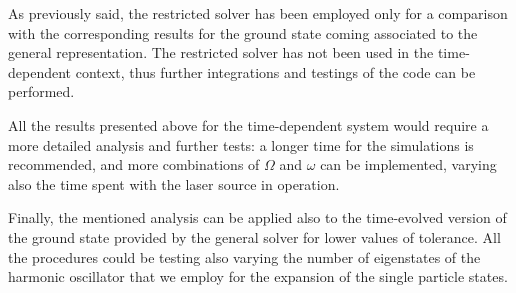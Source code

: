 As previously said, the restricted solver has been employed only for a comparison with the corresponding results for the ground state coming associated to the general representation. The restricted solver has not been used in the time-dependent context, thus further integrations and testings of the code can be performed. 

All the results presented above for the time-dependent system would require a more detailed analysis and further tests: a longer time for the simulations is recommended, and more combinations of $\Omega$ and $\omega$ can be implemented, varying also the time spent with the laser source in operation.

Finally, the mentioned analysis can be applied also to the time-evolved version of the ground state provided by the general solver for lower values of tolerance. All the procedures could be testing also varying the number of eigenstates of the harmonic oscillator that we employ for the expansion of the single particle states.